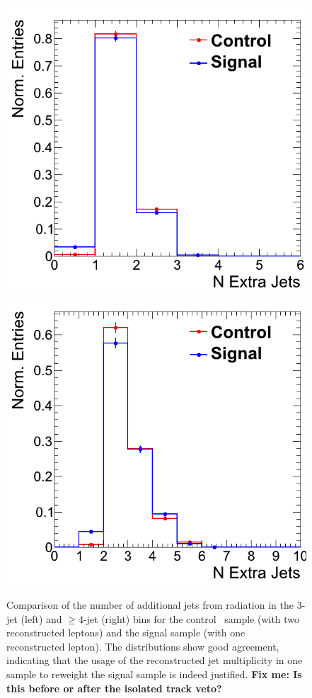 
\begin{figure}[hbt]
  \begin{center}
	\includegraphics[width=0.5\linewidth]{plots/ttdl_njets_presel_3j_comp.png}%
	\includegraphics[width=0.5\linewidth]{plots/ttdl_njets_presel_4j_comp.png}
	\caption{
	  \label{fig:dileptonnjets_signalcontrol_comp}%
          Comparison of the number of additional jets from radiation
          in the 3-jet (left) and $\ge4$-jet (right) bins for the control \ttll\
          sample (with two reconstructed leptons) and the signal
          sample (with one reconstructed lepton). The distributions
          show good agreement, indicating that the usage of the
          reconstructed jet multiplicity in one sample to reweight the
        signal sample is indeed justified. {\bf Fix me: Is this before or after the isolated track veto?}}  
      \end{center}
\end{figure}

